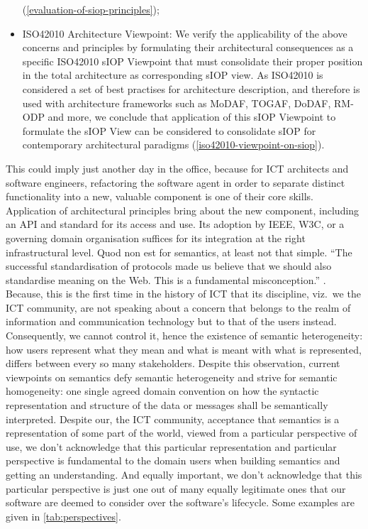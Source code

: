 \documentclass[sort&compress,preprint,authoryear,3p,twocolumn]{elsarticle}
\begin{document}
\begin{itemize}
  (\cref{evaluation-of-siop-principles});
\item
  ISO42010 Architecture Viewpoint: We verify the applicability of the
  above concerns and principles by formulating their architectural
  consequences as a specific ISO42010 sIOP Viewpoint that must
  consolidate their proper position in the total architecture as
  corresponding sIOP view. As ISO42010 is considered a set of best
  practises for architecture description, and therefore is used with
  architecture frameworks such as MoDAF, TOGAF, DoDAF, RM-ODP and more,
  we conclude that application of this sIOP Viewpoint to formulate the
  sIOP View can be considered to consolidate sIOP for contemporary
  architectural paradigms (\cref{iso42010-viewpoint-on-siop}).
\end{itemize}

This could imply just another day in the office, because for ICT
architects and software engineers, refactoring the software agent in
order to separate distinct functionality into a new, valuable component
is one of their core skills. Application of architectural principles
bring about the new component, including an API and standard for its
access and use. Its adoption by IEEE, W3C, or a governing domain
organisation suffices for its integration at the right infrastructural
level. Quod non est for semantics, at least not that simple. ``The
successful standardisation of protocols made us believe that we should
also standardise meaning on the Web. This is a fundamental
misconception.'' \citep{Janowicz:2013ui}. Because, this is the first
time in the history of ICT that its discipline, viz.~we the ICT
community, are not speaking about a concern that belongs to the realm of
information and communication technology but to that of the users
instead. Consequently, we cannot control it, hence the existence of
semantic heterogeneity: how users represent what they mean and what is
meant with what is represented, differs between every so many
stakeholders. Despite this observation, current viewpoints on semantics
defy semantic heterogeneity and strive for semantic homogeneity: one
single agreed domain convention on how the syntactic representation and
structure of the data or messages shall be semantically interpreted.
Despite our, the ICT community, acceptance that semantics is a
representation of some part of the world, viewed from a particular
perspective of use, we don't acknowledge that this particular
representation and particular perspective is fundamental to the domain
users when building semantics and getting an understanding. And equally
important, we don't acknowledge that this particular perspective is just
one out of many equally legitimate ones that our software are deemed to
consider over the software's lifecycle. Some examples are given in
\cref{tab:perspectives}.
\end{document}
